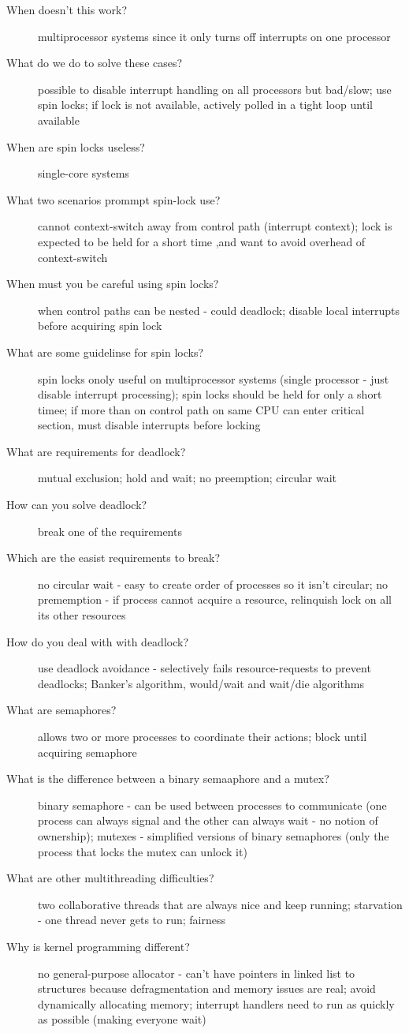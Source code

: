 \documentclass[10pt]{article}
\begin{document}
\begin{description}
\item[When doesn't this work?]
  multiprocessor systems since it only turns off interrupts on one processor
\item[What do we do to solve these cases?]
  possible to disable interrupt handling on all processors but bad/slow;
  use spin locks; if lock is not available, actively polled in a tight loop until available
\item[When are spin locks useless?]
  single-core systems
\item[What two scenarios prommpt spin-lock use?]
  cannot context-switch away from control path (interrupt context);
  lock is expected to be held for a short time ,and want to avoid overhead of context-switch
\item[When must you be careful using spin locks?]
  when control paths can be nested - could deadlock;
  disable local interrupts before acquiring spin lock
\item[What are some guidelinse for spin locks?]
  spin locks onoly useful on multiprocessor systems (single processor - just disable interrupt processing);
  spin locks should be held for only a short timee;
  if more than on control path on same CPU can enter critical section, must disable interrupts before locking
\item[What are requirements for deadlock?]
  mutual exclusion; hold and wait; no preemption; circular wait
\item[How can you solve deadlock?]
  break one of the requirements
\item[Which are the easist requirements to break?]
  no circular wait - easy to create order of processes so it isn't circular;
  no prememption - if process cannot acquire a resource, relinquish lock on all its other resources
\item[How do you deal with with deadlock?]
  use deadlock avoidance - selectively fails resource-requests to prevent deadlocks;
  Banker's algorithm, would/wait and wait/die algorithms
\item[What are semaphores?]
  allows two or more processes to coordinate their actions;
  block until acquiring semaphore
\item[What is the difference between a binary semaaphore and a mutex?]
  binary semaphore - can be used between processes to communicate (one process can always signal and the other can always wait - no notion of ownership);
  mutexes - simplified versions of binary semaphores (only the process that locks the mutex can unlock it)
\item[What are other multithreading difficulties?]
  two collaborative threads that are always nice and keep running;
  starvation - one thread never gets to run;
  fairness
\item[Why is kernel programming different?]
  no general-purpose allocator - can't have pointers in linked list to structures because defragmentation and memory issues are real;
  avoid dynamically allocating memory;
  interrupt handlers need to run as quickly as possible (making everyone wait)
\end{description}
\end{document}
